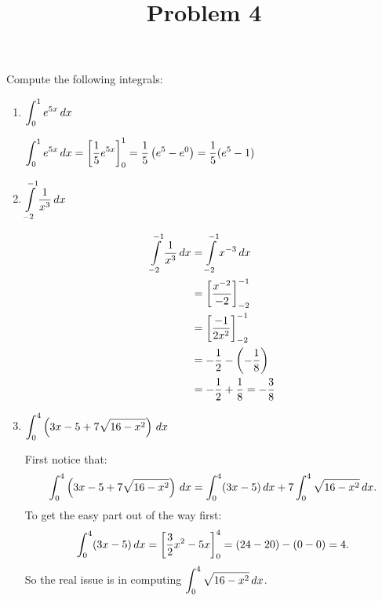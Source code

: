 \documentclass{ximera}
\title[Problem 4]{Problem 4}
\begin{document}
\begin{abstract} \end{abstract}
\maketitle


\begin{problem}
  Compute the following integrals:
  \begin{enumerate}
    

  \item  $\displaystyle \int_0^1 e^{5x} \,d x$
    \begin{explanation}
      $\displaystyle \int_0^1 e^{5x} \,d x  = \bigg[ \dfrac{1}{5} e^{5x} \bigg]_0^1= \dfrac{1}{5} \left( e^5 - e^0 \right) = \dfrac{1}{5} (e^5 - 1)$
    \end{explanation}
    \item  $\displaystyle \int\limits_{-2}^{-1} \dfrac{1}{x^3} \,d x$
    \begin{explanation}
      \begin{align*}
        \displaystyle \int\limits_{-2}^{-1} \dfrac{1}{x^3} \,d x &= \displaystyle \int\limits_{-2}^{-1} x^{-3} \,d x  \\
                                                 &= \bigg[ \dfrac{x^{-2}}{-2} \bigg]_{-2}^{-1}  \\
                                                 &= \bigg[ \dfrac{-1}{2x^2} \bigg]_{-2}^{-1}  \\
                                                 &= - \dfrac{1}{2} - \left( - \dfrac{1}{8} \right)  \\
                                                 &= - \dfrac{1}{2} + \dfrac{1}{8} = - \dfrac{3}{8}
      \end{align*}
    \end{explanation}
\item  $\displaystyle \int _0^4 \left( 3x - 5 + 7 \sqrt{16-x^2} \right) \,d x$
    \begin{explanation}
      First notice that:
      \begin{equation}\label{eq1}
        \displaystyle \int _0^4 \left( 3x - 5 + 7 \sqrt{16-x^2} \right) \,d x = \displaystyle \int_0^4 ( 3x - 5) \,d x + 7 \displaystyle \int_0^4 \sqrt{16-x^2} \,d x.
      \end{equation}
      To get the easy part out of the way first:
      \begin{equation}\label{eq2}
        \displaystyle \int_0^4 (3x-5) \,d x = \bigg[ \dfrac{3}{2} x^2 - 5x \bigg]_0^4 = (24 - 20) - (0-0) = 4. 
      \end{equation}
      So the real issue is in computing $\displaystyle \int_0^4 \sqrt{16-x^2} \,d x$.  
      

\end{explanation}
\end{enumerate}
\end{problem}
\end{document}
